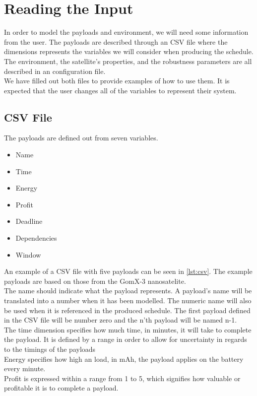 \section{Reading the Input} \label{sec:read_input}
In order to model the payloads and environment, we will need some information from the user.
The payloads are described through an CSV file where the dimensions represents the variables we will consider when producing the schedule.
The environment, the satellite's properties, and the robustness parameters are all described in an configuration file.\\
We have filled out both files to provide examples of how to use them. 
It is expected that the user changes all of the variables to represent their system.

\subsection{CSV File} \label{subsec:csv}
The payloads are defined out from seven variables.
\begin{itemize}
	\item	Name
	\item	Time
	\item	Energy
	\item	Profit
	\item	Deadline
	\item	Dependencies
	\item	Window
\end{itemize}
An example of a CSV file with five payloads can be seen in \cref{lst:csv}.
The example payloads are based on those from the GomX-3 nanosatelite\cite{gomx3}.\\
The name should indicate what the payload represents.
A payload's name will be translated into a number when it has been modelled. 
The numeric name will also be used when it is referenced in the produced schedule. 
The first payload defined in the CSV file will be number zero and the n'th payload will be named n-1.\\
The time dimension specifies how much time, in minutes, it will take to complete the payload.
It is defined by a range in order to allow for uncertainty in regards to the timings of the payloads\\
Energy specifies how high an load, in mAh, the payload applies on the battery every minute.\\
Profit is expressed within a range from 1 to 5, which signifies how valuable or profitable it is to complete a payload.
